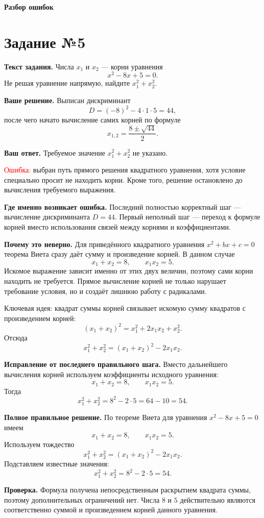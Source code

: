 \documentclass[12pt,a4paper]{article}
\newcommand{\err}{\textcolor{red}{Ошибка:}}
\newcommand{\idea}{\textcolor{blue!60!black}{Ключевая идея:}}
\newcommand{\tasktitle}[1]{\phantomsection\label{task:#1}\section*{Задание №#1}}
\begin{document}
\newpage
\vspace*{0.32\textheight}
\begin{center}
{\LARGE\bfseries Разбор ошибок}
\end{center}
\vfill
\newpage

\tasktitle{5}
\textbf{Текст задания.} Числа $x_1$ и $x_2$ --- корни уравнения
\[
x^2-8x+5=0.
\]
Не решая уравнение напрямую, найдите $x_1^2+x_2^2$.

\textbf{Ваше решение.} Выписан дискриминант
\[
D=(-8)^2-4\cdot1\cdot5=44,
\]
после чего начато вычисление самих корней по формуле
\[
x_{1,2}=\frac{8\pm\sqrt{44}}{2}.
\]

\textbf{Ваш ответ.} Требуемое значение $x_1^2+x_2^2$ не указано.

\err{} выбран путь прямого решения квадратного уравнения, хотя условие специально просит не находить корни. Кроме того, решение остановлено до вычисления требуемого выражения.

\textbf{Где именно возникает ошибка.} Последний полностью корректный шаг --- вычисление дискриминанта $D=44$. Первый неполный шаг --- переход к формуле корней вместо использования связей между корнями и коэффициентами.

\textbf{Почему это неверно.} Для приведённого квадратного уравнения $x^2+bx+c=0$ теорема Виета сразу даёт сумму и произведение корней. В данном случае
\[
x_1+x_2=8,\qquad x_1x_2=5.
\]
Искомое выражение зависит именно от этих двух величин, поэтому сами корни находить не требуется. Прямое вычисление корней не только нарушает требование условия, но и создаёт лишнюю работу с радикалами.

\idea{} квадрат суммы корней связывает искомую сумму квадратов с произведением корней:
\[
(x_1+x_2)^2=x_1^2+2x_1x_2+x_2^2.
\]
Отсюда
\[
x_1^2+x_2^2=(x_1+x_2)^2-2x_1x_2.
\]

\textbf{Исправление от последнего правильного шага.} Вместо дальнейшего вычисления корней используем коэффициенты исходного уравнения:
\[
x_1+x_2=8,\qquad x_1x_2=5.
\]
Тогда
\[
x_1^2+x_2^2=8^2-2\cdot5=64-10=54.
\]

\textbf{Полное правильное решение.} По теореме Виета для уравнения $x^2-8x+5=0$ имеем
\[
x_1+x_2=8,\qquad x_1x_2=5.
\]
Используем тождество
\[
x_1^2+x_2^2=(x_1+x_2)^2-2x_1x_2.
\]
Подставляем известные значения:
\[
x_1^2+x_2^2=8^2-2\cdot5=54.
\]

\textbf{Проверка.} Формула получена непосредственным раскрытием квадрата суммы, поэтому дополнительных ограничений нет. Числа $8$ и $5$ действительно являются соответственно суммой и произведением корней данного уравнения.
\end{document}
